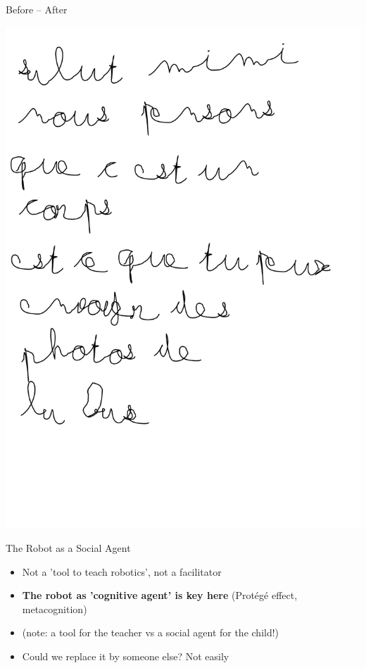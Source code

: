 \documentclass[compress]{beamer}
\begin{document}
{
\begin{frame}{Before -- After}
    \begin{center}
        \includegraphics[width=0.43\linewidth]{cowriter/lettre-base}
    \end{center}
\end{frame}
}

\begin{frame}{The Robot as a Social Agent}
    \begin{itemize}
        \item<1-> Not a 'tool to teach robotics', not a facilitator
        \item<2-> {\bf The robot as 'cognitive agent' is key here} (Protégé effect,
            metacognition)
        \item<3-> (note: a tool for the teacher vs a social agent for the child!)
        \item<4-> Could we replace it by someone else? Not easily
    \end{itemize}

\end{frame}
\end{document}
